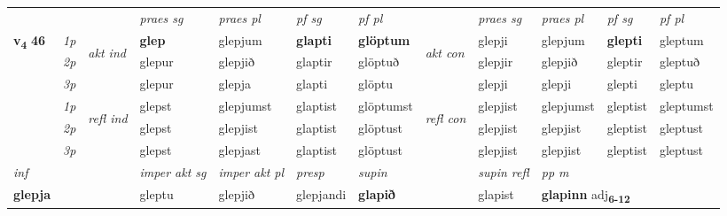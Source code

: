 \begin{longtable}[l]{X>{\footnotesize\itshape}llXXXXlXXXX}
\midrule

 & &   & \textit{praes sg}  & \textit{praes pl}    & \textit{ pf sg} & \textit{pf pl} & & \textit{praes sg}  & \textit{praes pl}    & \textit{pf sg} & \textit{pf pl }  \\ \cmidrule{4-7} \cmidrule{9-12}
 \multirow{2}{*}{{{\textbf{v{\textsubscript{4}}} \Large{\textbf{46}}}}}  & 1p & \multirow{3}{*}{\begin{turn}{90}\textit{akt ind}\end{turn}} & \textbf{glep} & glepjum & \textbf{glapti} & \textbf{glöptum} & \multirow{3}{*}{\begin{turn}{90}\textit{akt con}\end{turn}} &glepji & glepjum & \textbf{glepti} & gleptum\\*
 & 2p &  &  glepur  & glepjið & glaptir & glöptuð & & glepjir & glepjið & gleptir & gleptuð \\*
 & 3p &  & glepur & glepja & glapti & glöptu & & glepji & glepji& glepti & gleptu \\*
\cmidrule{4-7} \cmidrule{9-12}
 & 1p & \multirow{3}{*}{\begin{turn}{90}\textit{refl ind}\end{turn}}  & glepst & glepjumst & glaptist & glöptumst & \multirow{3}{*}{\begin{turn}{90}\textit{refl con}\end{turn}}  &glepjist & glepjumst & gleptist & gleptumst \\*
 & 2p &  & glepst & glepjist & glaptist & glöptust & &glepjist & glepjist & gleptist & gleptust \\*
 & 3p  & & glepst & glepjast & glaptist & glöptust & & glepjist & glepjist& gleptist & gleptust \\*
\cmidrule{4-7} \cmidrule{9-12}

   {\textit{inf}} & &  & \textit{imper akt sg} & \textit{imper akt pl}   & \textit{presp} & \textit{supin} && \textit{supin refl} & \textit{pp m} \\*
  {\textbf{glepja}} & && gleptu  & glepjið   & glepjandi &  \textbf{glapið} && glapist & \multicolumn{2}{l}{\textbf{glapinn} adj\textbf{\textsubscript{6-12}}} \\*

\midrule


\end{longtable}
